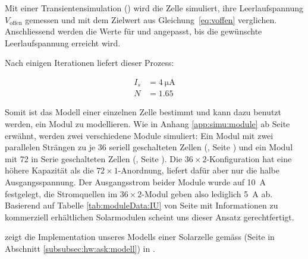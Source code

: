 Mit einer  Transientensimulation () wird die  Zelle simuliert,
ihre  Leerlaufspannung  $V_{\mathrm{offen}}$  gemessen und  mit  dem  Zielwert
aus   Gleichung~\ref{eq:voffen}  verglichen.  Anschliessend  werden die  Werte f\"ur   und 
angepasst, bis die gew\"unschte Leerlaufspannung erreicht wird.

Nach einigen Iterationen liefert dieser Prozess\footnotemark:


\begin{align}
    \label{eq:cell:diode:IS:N:result}
    I_s &= \SI{4}{\micro\ampere} \\
    N   &= 1.65
\end{align}

Somit ist  das Modell  einer einzelnen  Zelle bestimmt  und kann  dazu benutzt
werden,  ein   Modul  zu  modellieren. Wie  in   Anhang  \ref{app:simu:module}
ab  Seite   \pageref{app:simu:module}  erw\"ahnt,  werden   zwei  verschiedene
Module   simuliert: Ein   Modul  mit   zwei   parallelen   Str\"angen  zu   je
36  seriell   geschalteten  Zellen  (,
Seite  \pageref{fig:ltspice:module:cellBased:36x2})  und   ein  Modul  mit  72
in   Serie   geschalteten  Zellen   (,
Seite     \pageref{fig:ltspice:module:cellBased:72x1}). Die     $36     \times
2$-Konfiguration   hat   eine  h\"ohere   Kapazit\"at   als
die   $72  \times   1$-Anordnung,   liefert  daf\"ur   aber   nur  die   halbe
Ausgangsspannung. Der Ausgangsstrom  beider Module wurde  auf \SI{10}{\ampere}
festgelegt,  die Stromquellen  im  $36 \times  2$-Modul  geben also  lediglich
\SI{5}{\ampere}  ab. Basierend auf  Tabelle \ref{tab:moduleData:IU}  von Seite
\pageref{tab:moduleData:IU}  mit Informationen  zu kommerziell  erh\"altlichen
Solarmodulen scheint uns dieser Ansatz gerechtfertigt.

   zeigt   die  Implementation   unseres   Modells
einer     Solarzelle      gem\"ass          (Seite
\pageref{fig:circuit:solarCell} in Abschnitt \ref{subsubsec:hw:ask:modell}) in
.

